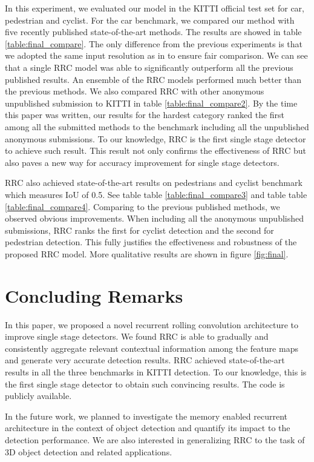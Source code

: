 \documentclass[10pt,twocolumn,letterpaper]{article}
\begin{document}
In this experiment, we evaluated our model in the KITTI official test set for car, pedestrian and cyclist. For the car benchmark, we compared our method with five recently published state-of-the-art methods. The results are showed in table \ref{table:final_compare}. The only difference from the previous experiments is that we adopted the same input resolution as in \cite{Cai16} to ensure fair comparison. We can see that a single RRC model was able to significantly outperform all the previous published results. An ensemble of the RRC models performed much better than the previous methods. We also compared RRC with other anonymous unpublished submission to KITTI in table \ref{table:final_compare2}. By the time this paper was written, our results for the hardest category ranked the first among all the submitted methods to the benchmark including all the unpublished anonymous submissions. To our knowledge, RRC is the first single stage detector to achieve such result. This result not only confirms the effectiveness of RRC but also paves a new way for accuracy improvement for single stage detectors.

RRC also achieved state-of-the-art results on pedestrians and cyclist benchmark which measures IoU of 0.5. See table table \ref{table:final_compare3} and table table \ref{table:final_compare4}. Comparing to the previous published methods, we observed obvious improvements. When including all the anonymous unpublished submissions, RRC ranks the first for cyclist detection and the second for pedestrian detection. This fully justifies the effectiveness and robustness of the proposed RRC model. More qualitative results are shown in figure \ref{fig:final}.

\section{Concluding Remarks}
In this paper, we proposed a novel recurrent rolling convolution architecture to improve single stage detectors. We found RRC is able to gradually and consistently aggregate relevant contextual information among the feature maps and generate very accurate detection results. RRC achieved state-of-the-art results in all the three benchmarks in KITTI detection. To our knowledge, this is the first single stage detector to obtain such convincing results. The code is publicly available.

In the future work, we planned to investigate the memory enabled recurrent architecture in the context of object detection and quantify its impact to the detection performance. We are also interested in generalizing RRC to the task of 3D object detection and related applications.


{\small


}
\end{document}
